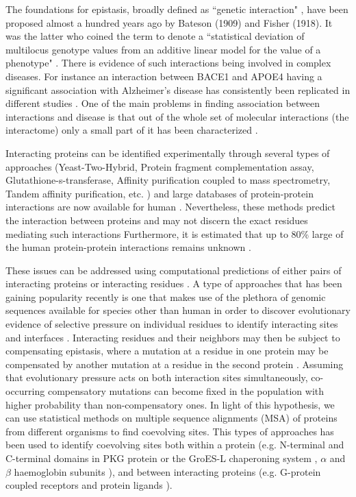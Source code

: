 The foundations for epistasis, broadly defined as “genetic interaction" \cite{gao2010classification},  have been proposed almost a hundred years ago by Bateson (1909) and Fisher (1918). It was the latter who coined the term to denote a “statistical deviation of multilocus genotype values from an additive linear model for the value of a phenotype" \cite{gao2010classification}. There is evidence of such interactions being involved in complex diseases. For instance an interaction between BACE1 and APOE4 having a significant association with Alzheimer's disease has consistently been replicated in different studies \cite{combarros2009epistasis}. One of the main problems in finding association between interactions and disease is that out of the whole set of molecular interactions (the interactome) only a small part of it has been characterized \cite{venkatesan2009empirical}.

Interacting proteins can be identified experimentally through several types of approaches (Yeast-Two-Hybrid, Protein fragment complementation assay, Glutathione-s-transferase, Affinity purification coupled to mass spectrometry, Tandem affinity purification, etc. \cite{shoemaker2007deciphering}) and large databases of protein-protein interactions are now available for human \cite{stark2006biogrid, shoemaker2007deciphering}. Nevertheless, these methods predict the interaction between proteins and may not discern the exact residues mediating such interactions Furthermore, it is estimated that up to 80\% large of the human protein-protein interactions remains unknown \cite{venkatesan2009empirical}.

These issues can be addressed using computational predictions of either pairs of interacting proteins or interacting residues \cite{shoemaker2007decipheringP2}. A type of approaches that has been gaining popularity recently is one that makes use of the plethora of genomic sequences available for species other than human in order to discover evolutionary evidence of selective pressure on individual residues to identify interacting sites and interfaces \cite{marks2012protein}. Interacting residues and their neighbors may then be subject to compensating epistasis, where a mutation at a residue in one protein may be compensated by another mutation at a residue in the second protein \cite{pazos1997correlated}. Assuming that evolutionary pressure acts on both interaction sites simultaneously, co-occurring compensatory mutations can become fixed in the population with higher probability than non-compensatory ones. In light of this hypothesis, we can use statistical methods on multiple sequence alignments (MSA) of proteins from different organisms to find coevolving sites. This types of approaches has been used to identify coevolving sites both within a protein (e.g. N-terminal and C-terminal domains in PKG protein \cite{goh2000co} or the GroES-L chaperoning system \cite{ruiz2013coevolution}, $\alpha$ and $\beta$ haemoglobin subunits \cite{pazos1997correlated}), and between interacting proteins (e.g. G-protein coupled receptors and protein ligands \cite{goh2000co}).

